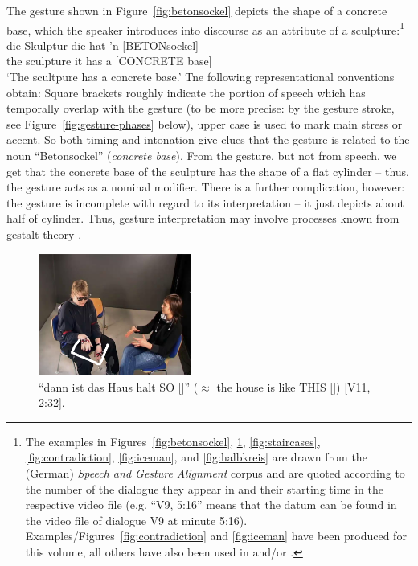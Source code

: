 \documentclass[output=paper]{langsci/langscibook}
\begin{document}
The gesture shown in Figure~\ref{fig:betonsockel} depicts the shape of a concrete base, which the speaker introduces into discourse as an attribute of a sculpture:\footnote{The examples in Figures~\ref{fig:betonsockel}, \ref{fig:so}, \ref{fig:staircases}, \ref{fig:contradiction}, \ref{fig:iceman}, and \ref{fig:halbkreis} are drawn from the (German) \emph{Speech and Gesture Alignment} corpus \citep[,][]{Luecking:Bergmann:Hahn:Kopp:Rieser:2010} and are quoted according to the number of the dialogue they appear in and their starting time in the respective video file (e.g. \enquote{V9, 5:16} means that the datum can be found in the video file of dialogue V9 at minute 5:16). Examples/Figures~\ref{fig:contradiction} and \ref{fig:iceman} have been produced for this volume, all others have also been used in \citet{Luecking:2013:a} and/or \citet{Luecking:2016}.}
%
\ea \label{ex:betonsockel}
\gll die Skulptur die hat 'n [BETONsockel] \\
     the sculpture it has a {[CONCRETE base]} \\
\glt \enquote*{The scultpure has a concrete base.}
\z
%
Tne following representational conventions obtain: Square brackets roughly indicate the portion of speech which has temporally overlap with the gesture (to be more precise: by the gesture stroke, see Figure~\ref{fig:gesture-phases} below), upper case is used to mark main stress or accent.
%
So both timing and intonation give clues that the gesture is related to the noun \enquote{Betonsockel} (\textit{concrete base}).
%
From the gesture, but not from speech, we get that the concrete base of the sculpture has the shape of a flat cylinder -- thus, the gesture acts as a nominal modifier.
%
There is a further complication, however: the gesture is incomplete with regard to its interpretation -- it just depicts about half of cylinder. 
%
Thus, gesture interpretation may involve processes known from gestalt theory \citetext{see \citealp{Luecking:2016} on a \emph{good continuation}  constraint relevant to \ref{ex:betonsockel}/Figure~\ref{fig:betonsockel}}.


\begin{figure}
  \centering
  \includegraphics[trim={1cm 0 5cm 5cm}, clip, width=5cm]{figures/mmsubcat2}
  \caption[Like this]{\enquote{dann ist das Haus halt SO []} ($\approx$ the house is like THIS []) [V11, 2:32].}
  \label{fig:so}
\end{figure}
\end{document}
